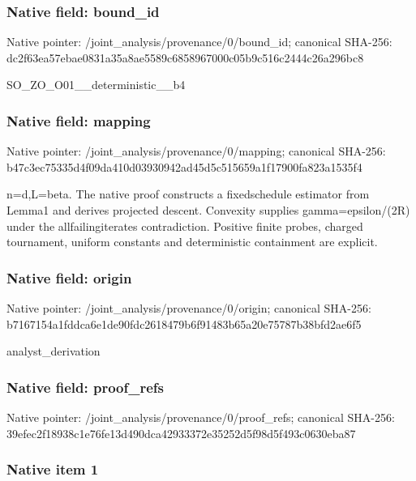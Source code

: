 \documentclass[10pt,a4paper]{article}
\begin{document}
\subsubsection{Native field: bound\_id}


Native pointer: /joint\_analysis/provenance/0/bound\_id; canonical SHA-256: dc2f63ea57ebae0831a35a8a\allowbreak{}e5589c6858967000c05b9c51\allowbreak{}6c2444c26a296bc8


SO\_ZO\_O01\_\_deterministic\_\_b4


\subsubsection{Native field: mapping}


Native pointer: /joint\_analysis/provenance/0/mapping; canonical SHA-256: b47c3ec75335d4f09da410d0\allowbreak{}3930942ad45d5c515659a1f1\allowbreak{}7900fa823a1535f4


n=d,L=beta. The native proof constructs a fixedschedule estimator from Lemma1 and derives projected descent. Convexity supplies gamma=epsilon/(2R) under the allfailingiterates contradiction. Positive finite probes, charged tournament, uniform constants and deterministic containment are explicit.


\subsubsection{Native field: origin}


Native pointer: /joint\_analysis/provenance/0/origin; canonical SHA-256: b7167154a1fddca6e1de90fd\allowbreak{}c2618479b6f91483b65a20e7\allowbreak{}5787b38bfd2ae6f5


analyst\_derivation


\subsubsection{Native field: proof\_refs}


Native pointer: /joint\_analysis/provenance/0/proof\_refs; canonical SHA-256: 39efec2f18938c1e76fe13d4\allowbreak{}90dca42933372e35252d5f98\allowbreak{}d5f493c0630eba87



\subsubsection{Native item 1}
\end{document}
